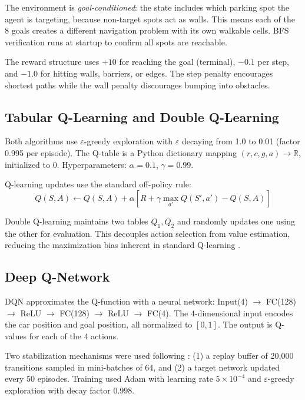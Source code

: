 \documentclass[letterpaper]{article}
\begin{document}
The environment is \textit{goal-conditioned}: the state includes which parking spot the agent is targeting, because non-target spots act as walls. This means each of the 8 goals creates a different navigation problem with its own walkable cells. BFS verification runs at startup to confirm all spots are reachable.

The reward structure uses $+10$ for reaching the goal (terminal), $-0.1$ per step, and $-1.0$ for hitting walls, barriers, or edges. The step penalty encourages shortest paths while the wall penalty discourages bumping into obstacles.

\subsection{Tabular Q-Learning and Double Q-Learning}

Both algorithms use $\varepsilon$-greedy exploration with $\varepsilon$ decaying from 1.0 to 0.01 (factor 0.995 per episode). The Q-table is a Python dictionary mapping $(r, c, g, a) \to \mathbb{R}$, initialized to 0. Hyperparameters: $\alpha = 0.1$, $\gamma = 0.99$.

Q-learning updates use the standard off-policy rule:
\begin{equation}
    Q(S,A) \leftarrow Q(S,A) + \alpha\left[R + \gamma \max_{a'} Q(S',a') - Q(S,A)\right]
\end{equation}

Double Q-learning maintains two tables $Q_1, Q_2$ and randomly updates one using the other for evaluation. This decouples action selection from value estimation, reducing the maximization bias inherent in standard Q-learning \citep{hasselt2010double}.

\subsection{Deep Q-Network}

DQN approximates the Q-function with a neural network: Input(4) $\to$ FC(128) $\to$ ReLU $\to$ FC(128) $\to$ ReLU $\to$ FC(4). The 4-dimensional input encodes the car position and goal position, all normalized to $[0,1]$. The output is Q-values for each of the 4 actions.

Two stabilization mechanisms were used following \citet{mnih2015human}: (1) a replay buffer of 20,000 transitions sampled in mini-batches of 64, and (2) a target network updated every 50 episodes. Training used Adam with learning rate $5 \times 10^{-4}$ and $\varepsilon$-greedy exploration with decay factor 0.998.
\end{document}
